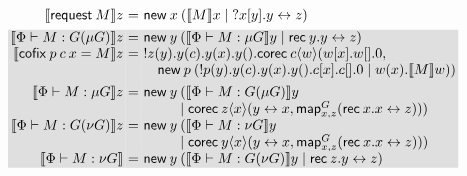 \documentclass[orivec,envcountsame]{llncs}
\makeatletter
\newcommand{\gvtyp}[3]{#1 \vdash #2 : #3}
\newcommand{\mapname}{\mathsf{map}}
\newcommand{\map}[3]{\mapname^{#1}_{#2}(#3)}
\newcommand{\mkwd}[1]{\mathsf{#1}}
\newcommand{\link}[2]{#1 \leftrightarrow #2}
\newcommand{\cut}[4]{\mkwd{new}\:#1 \: (#3 \mid #4)}
\newcommand{\replicate}[2]{{!#1(#2)}}
\newcommand{\derelict}[2]{{?#1[#2]}}
\newcommand{\rec}[1]{\mkwd{rec}\:#1}
\newcommand{\corec}[4]{\mkwd{corec}\:{#1} \langle #2 \rangle (#3,#4)}
\newcommand{\lrkwd}{\mkwd{cofix}}
\newcommand{\gvfix}[3]{\lrkwd\:#1\:#2 = #3}
\newcommand{\gvrequest}[1]{\mkwd{request}\:#1}
\newcommand{\key}{\mkwd}
\newcommand{\tocpbig}[1]{\left\llbracket #1 \right\rrbracket}
\newcommand{\tocp}[1]{\llbracket #1 \rrbracket}
\newcommand{\ba}{\begin{array}}
\newcommand{\ea}{\end{array}}
\newcommand{\bl}{\ba[t]{@{}l@{}}}
\newcommand{\el}{\ea}
\newenvironment{equations}{\[\ba{@{}r@{~}c@{~}l@{}}}{\ea\]}
\newcommand\shade[1]{\setlength{\fboxsep}{0pt}\colorbox{shade}{\ensuremath{#1}}}
\newcommand\shaderow{\noalign{\vskip-0.4pt}\rowcolor{shade}[0.6mm]}
\makeatother
\begin{document}
\begin{figure}[float]
\begin{equations}
\tocp{\gvrequest{M}}z &=& \cut{x}{}{\tocp{M}x}{\derelict{x}{y}.\link{y}{z}} \\[1ex] \shaderow
\tocp{\gvtyp{\Phi}{M}{G(\mu G)}}z &=&
  \cut{y}{\nu \tocp{G}}{\tocp{\gvtyp{\Phi}{M}{\mu G}}y}{\rec{y}.\link{y}{z}} \\ \shaderow
\tocp{\gvfix{p}{c\:x}{M}}z &=&
\replicate{z}{y}.y(c).y(x).y().
 \corec{c}{w}{w[x].w[].0}{\\ \shaderow
&& \quad \cut{p}{}{\replicate{p}{y}.y(c).y(x).y().c[x].c[].0}{w(x).\tocp{M}w}} \\[1ex]
\shaderow
\tocp{\gvtyp{\Phi}{M}{\mu G}}z &=&
\key{new}\:y\:
  \bl
  (
       \tocp{\gvtyp{\Phi}{M}{G(\mu G)}}y \\
  \mid \corec{z}{x}
             {\link{y}{x}}
             {\map{G}{x,z}{\rec{x}.\link{x}{z}}}) \\
  \el \\ \shaderow
\tocp{\gvtyp{\Phi}{M}{G(\nu G)}}z &=&
\key{new}\:y\:
  \bl
  (
       \tocp{\gvtyp{\Phi}{M}{\nu G}}y \\
  \mid \corec{y}{x}
             {\link{y}{x}}
             {\map{G}{x,z}{\rec{x}.\link{x}{z}}}) \\
  \el \\ \shaderow
\tocp{\gvtyp{\Phi}{M}{\nu G}} &=&
  \cut{y}{\nu \tocp{G}}{\tocp{\gvtyp{\Phi}{M}{G(\nu G)}}y}{\rec{z}.\link{y}{z}} \\
\end{equations}%

\end{figure}
\end{document}
